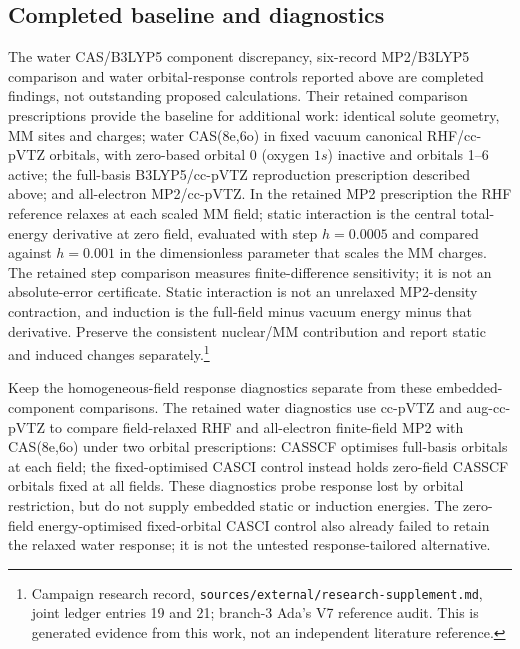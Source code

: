 \documentclass{article}
\newcommand{\record}[1]{\footnote{Campaign research record, \texttt{sources/external/research-supplement.md}, #1. This is generated evidence from this work, not an independent literature reference.}}
\begin{document}
\subsection{Completed baseline and diagnostics}
The water CAS/B3LYP5 component discrepancy, six-record MP2/B3LYP5 comparison and water orbital-response controls reported above are completed findings, not outstanding proposed calculations. Their retained comparison prescriptions provide the baseline for additional work: identical solute geometry, MM sites and charges; water CAS(8e,6o) in fixed vacuum canonical RHF/cc-pVTZ orbitals, with zero-based orbital 0 (oxygen \(1s\)) inactive and orbitals 1--6 active; the full-basis B3LYP5/cc-pVTZ reproduction prescription described above; and all-electron MP2/cc-pVTZ. In the retained MP2 prescription the RHF reference relaxes at each scaled MM field; static interaction is the central total-energy derivative at zero field, evaluated with step \(h=0.0005\) and compared against \(h=0.001\) in the dimensionless parameter that scales the MM charges. The retained step comparison measures finite-difference sensitivity; it is not an absolute-error certificate. Static interaction is not an unrelaxed MP2-density contraction, and induction is the full-field minus vacuum energy minus that derivative. Preserve the consistent nuclear/MM contribution and report static and induced changes separately.\record{joint ledger entries 19 and 21; branch-3 Ada's V7 reference audit}

Keep the homogeneous-field response diagnostics separate from these embedded-component comparisons. The retained water diagnostics use cc-pVTZ and aug-cc-pVTZ to compare field-relaxed RHF and all-electron finite-field MP2 with CAS(8e,6o) under two orbital prescriptions: CASSCF optimises full-basis orbitals at each field; the fixed-optimised CASCI control instead holds zero-field CASSCF orbitals fixed at all fields. These diagnostics probe response lost by orbital restriction, but do not supply embedded static or induction energies. The zero-field energy-optimised fixed-orbital CASCI control also already failed to retain the relaxed water response; it is not the untested response-tailored alternative.
\end{document}
